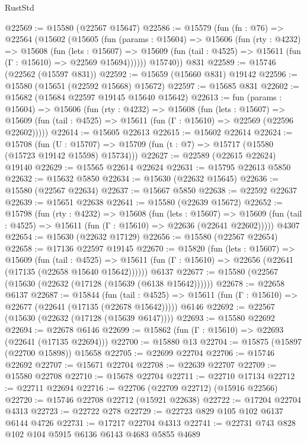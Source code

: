 \begin{lexlean}{RustStd}
\begin{coremodule}
@22569 := @15580 (@22567 @15647)
@22586 := @15579
    (fun (fn : @76) =>
    @22564
      (@15602
        (@15605
          (fun (params : @15604) =>
          @15606
            (fun (rty : @4232) =>
            @15608
              (fun (lets : @15607) =>
              @15609 (fun (tail : @4525) => @15611 (fun (Γ : @15610) => @22569 @15694))))))
        @15740))
    @831
@22589 := @15746 (@22562 (@15597 @831))
@22592 := @15659 (@15660 @831) @19142
@22596 := @15580 (@15651 (@22592 @15668) @15672)
@22597 := @15685 @831
@22602 := @15682 (@15684 @22597 @19145 @15640 @15642)
@22613 := fun (params : @15604) =>
  @15606
    (fun (rty : @4232) =>
    @15608
      (fun (lets : @15607) =>
      @15609 (fun (tail : @4525) => @15611 (fun (Γ : @15610) => @22569 (@22596 @22602)))))
@22614 := @15605 @22613
@22615 := @15602 @22614
@22624 := @15708
    (fun (U : @15707) => @15709 (fun (t : @7) => @15717 (@15580 (@15723 @19142 @15598) @15734)))
@22627 := @22589 (@22615 @22624) @19140
@22629 := @15565 @22614 @22624
@22631 := @15795 @22613 @5850
@22632 := @15632 @5850
@22634 := @15630 (@22632 @15645)
@22636 := @15580 (@22567 @22634)
@22637 := @15667 @5850
@22638 := @22592 @22637
@22639 := @15651 @22638
@22641 := @15580 (@22639 @15672)
@22652 := @15798
    (fun (rty : @4232) =>
    @15608
      (fun (lets : @15607) =>
      @15609 (fun (tail : @4525) => @15611 (fun (Γ : @15610) => @22636 (@22641 @22602)))))
    @4307
@22654 := @15630 (@22632 @17129)
@22656 := @15580 (@22567 @22654)
@22658 := @17136 @22597 @19145
@22670 := @15820
    (fun (lets : @15607) =>
    @15609
      (fun (tail : @4525) =>
      @15611 (fun (Γ : @15610) => @22656 (@22641 (@17135 (@22658 @15640 @15642))))))
    @6137
@22677 := @15580 (@22567 (@15630 (@22632 (@17128 (@15639 (@6138 @15642))))))
@22678 := @22658 @6137
@22687 := @15844
    (fun (tail : @4525) => @15611 (fun (Γ : @15610) => @22677 (@22641 (@17135 (@22678 @15642)))))
    @6146
@22692 := @22567 (@15630 (@22632 (@17128 (@15639 @6147))))
@22693 := @15580 @22692
@22694 := @22678 @6146
@22699 := @15862 (fun (Γ : @15610) => @22693 (@22641 (@17135 @22694)))
@22700 := @15880 @13
@22704 := @15875 (@15897 (@22700 @15898)) @15658
@22705 := @22699 @22704
@22706 := @15746 @22692
@22707 := @15671 @22704
@22708 := @22639 @22707
@22709 := @15580 @22708
@22710 := @15678 @22704
@22711 := @22710 @17134
@22712 := @22711 @22694
@22716 := @22706 (@22709 @22712) (@15916 @22566)
@22720 := @15746 @22708 @22712 (@15921 @22638)
@22722 := @17204 @22704 @4313
@22723 := @22722 @278
@22729 := @22723 @829 @105 @102 @6137 @6144 @4726
@22731 := @17217 @22704 @4313
@22741 := @22731 @743 @828 @102 @104 @5915 @6136 @6143 @4683 @5855 @4689

\end{coremodule}
\end{lexlean}
